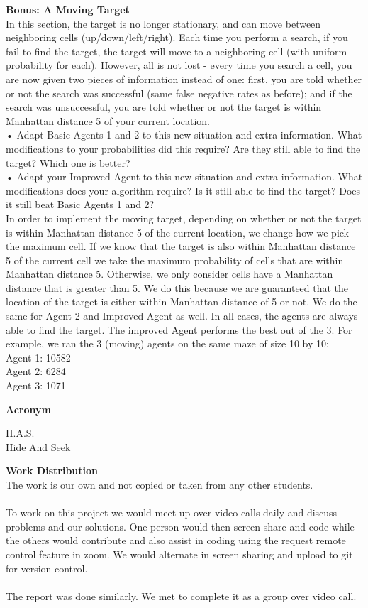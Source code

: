 \documentclass{article}
\theoremstyle{definition}
\begin{document}
\textbf{Bonus: A Moving Target} \\
In this section, the target is no longer stationary, and can move between neighboring cells (up/down/left/right). Each time you perform a search, if you fail to find the target, the target will move to a neighboring cell (with uniform probability for each). However, all is not lost - every time you search a cell, you are now given two pieces of information instead of one: first, you are told whether or not the search was successful (same false negative rates as before); and if the search was unsuccessful, you are told whether or not the target is within Manhattan distance 5 of your current location. \\
• Adapt Basic Agents 1 and 2 to this new situation and extra information. What modifications to your probabilities did this require? Are they still able to find the target? Which one is better?\\
• Adapt your Improved Agent to this new situation and extra information. What modifications does your algorithm require? Is it still able to find the target? Does it still beat Basic Agents 1 and 2? \\

In order to implement the moving target, depending on whether or not the target is within Manhattan distance 5 of the current location, we change how we pick the maximum cell. If we know that the target is also within Manhattan distance 5 of the current cell we take the maximum probability of cells that are within Manhattan distance 5. Otherwise, we only consider cells have a Manhattan distance that is greater than 5. We do this because we are guaranteed that the location of the target is either within Manhattan distance of 5 or not. We do the same for Agent 2 and Improved Agent as well. In all cases, the agents are always able to find the target. The improved Agent performs the best out of the 3. For example, we ran the 3 (moving) agents on the same maze of size 10 by 10: \\
Agent 1: 10582 \\
Agent 2: 6284 \\
Agent 3: 1071 \\

\smallskip

\textbf{Acronym}

H.A.S. \\
Hide And Seek

\smallskip

\textbf{Work Distribution}
\\
The work is our own and not copied or taken from any other students. 
\\\\
To work on this project we would meet up over video calls daily and discuss problems and our solutions. One person would then screen share and code while the others would contribute and also assist in coding using the request remote control feature in zoom. We would alternate in screen sharing and upload to git for version control. 
\\\\
The report was done similarly. We met to complete it as a group over video call. 
\smallskip
\end{document}
